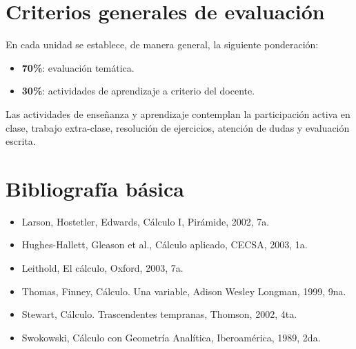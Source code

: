 \documentclass[12pt]{article}
\begin{document}
\section{Criterios generales de evaluación}

En cada unidad se establece, de manera general, la siguiente ponderación:

\begin{itemize}
    \item \textbf{70\%}: evaluación temática.
    \item \textbf{30\%}: actividades de aprendizaje a criterio del docente.
\end{itemize}

Las actividades de enseñanza y aprendizaje contemplan la participación activa en clase, trabajo extra-clase, resolución de ejercicios, atención de dudas y evaluación escrita.

\section{Bibliograf\'ia b\'asica}


\begin{itemize}

\item Larson, Hostetler, Edwards, Cálculo I, Pirámide, 2002, 7a. 
\item Hughes-Hallett, Gleason et al., Cálculo aplicado, CECSA, 2003, 1a.   
\item Leithold, El cálculo, Oxford, 2003, 7a. 
\item Thomas, Finney, Cálculo. Una variable, Adison Wesley Longman, 1999, 9na.
\item Stewart, Cálculo. Trascendentes tempranas, Thomson, 2002,  4ta. 
\item Swokowski, Cálculo  con Geometría Analítica, Iberoamérica, 1989, 2da. 
 
\end{itemize}
\end{document}
